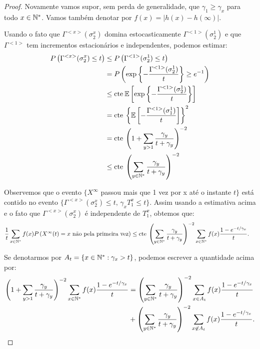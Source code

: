 \begin{proof}
  Novamente vamos supor, sem perda de generalidade, que $\gamma_1 \geq
  \gamma_x$ para todo $x \in {\mathbb{N^*}}$. Vamos também denotar por $f(x) =
  |h(x) - h(\infty)|$.

  Usando o fato que $\Gamma^{<x>} (\sigma^x_2)$ domina
  estocasticamente $\Gamma^{<1>} (\sigma^1_2)$ e que $\Gamma^{<1>}$
  tem incrementos estacionários e independentes, podemos estimar:
  \begin{align*}
    P \left( \Gamma^{<x>} (\sigma^x_2) \leq t \right)
    &\leq P \left( \Gamma^{<1>} (\sigma^1_2) \leq t \right)\\
    &= P \left( \exp \left\{
        -\frac{\Gamma^{<1>}(\sigma^1_2)}{t}
      \right\}
        \geq e^{-1} \right)\\
    &\leq \mathrm{cte }\:
    {\mathbb{E}} \left[ \exp \left\{
        -\frac{\Gamma^{<1>}(\sigma^1_2)}{t}
      \right\} \right]\\
    &= \mathrm{cte} \: \left\{ {\mathbb{E}} \left[  -\frac{\Gamma^{<1>}(\sigma^1_1)}{t}
      \right] \right\}^2 \\
    &= \mathrm{cte} \: \left( 1 + \sum_{y > 1} \frac{\gamma_y}{t +
        \gamma_y}  \right)^{-2}\\
    &\leq \mathrm{cte} \: \left( \sum_{y \in {\mathbb{N^*}}} \frac{\gamma_y}{t +
        \gamma_y}  \right)^{-2}
  \end{align*}

  Observemos que o evento $\{ X^\infty $ passou mais que 1 vez por x
  até o instante $t\}$ está contido no evento $\{ \Gamma^{<x>}
  (\sigma^x_2) \leq t,\, \gamma_x T^x_1 \leq t\}$. Assim usando a
  estimativa acima e o fato que $\Gamma^{<x>} (\sigma^x_2)$ é
  independente de $T_1^x$, obtemos que:
  \begin{align*}
    \frac{1}{t} \sum_{x\in{\mathbb{N^*}}} f(x) P\left( X^\infty(t) = x \text{ não
        pela primeira vez}\right) 
    &\leq \mathrm{cte} \: \left( \sum_{y \in {\mathbb{N^*}}} \frac{\gamma_y}{t +
        \gamma_y}  \right)^{-2} \sum_{x \in {\mathbb{N^*}}} f(x) \frac{1 -
      e^{-t/\gamma_x}}{t} .
  \end{align*}

  Se denotarmos por $A_t = \{ x \in {\mathbb{N^*}}: \gamma_x > t \}$,
  podemos escrever a quantidade acima por:
  \begin{align}
    \label{eq:erro-gerador-partes}
    \left( 1 + \sum_{y > 1} \frac{\gamma_y}{t + \gamma_y} \right)^{-2}
    \sum_{x \in {\mathbb{N^*}}} f(x) \frac{1 - e^{-t/\gamma_x}}{t}
    &= \left( \sum_{y \in {\mathbb{N^*}}} \frac{\gamma_y}{t + \gamma_y} \right)^{-2}
    \sum_{x \in A_t} f(x) \frac{1 - e^{-t/\gamma_x}}{t}\\
    &+ \left( \sum_{y \in {\mathbb{N^*}}} \frac{\gamma_y}{t + \gamma_y} \right)^{-2}
    \sum_{x \not\in A_t} f(x) \frac{1 - e^{-t/\gamma_x}}{t} .\notag
  \end{align}


\end{proof}
